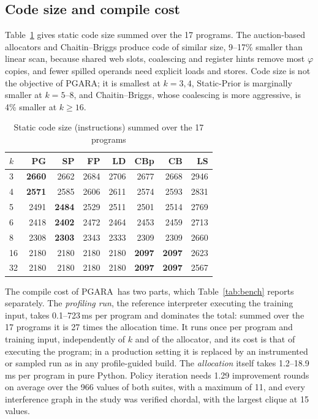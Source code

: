 \documentclass{ieeeaccess}
\newcommand{\MG}{PGARA}
\begin{document}
\subsection{Code size and compile cost}
\label{sec:cost}

Table~\ref{tab:size} gives static code size summed over the 17
programs. The auction-based allocators and Chaitin--Briggs produce code
of similar size, 9--17\% smaller than linear scan, because shared web
slots, coalescing and register hints remove most $\varphi$ copies, and
fewer spilled operands need explicit loads and stores. Code size is not
the objective of \MG; it is smallest at $k=3,4$, Static-Prior is
marginally smaller at $k=5$--8, and Chaitin--Briggs, whose coalescing
is more aggressive, is 4\% smaller at $k\ge16$.

\begin{table}[t]
\centering
\caption{Static code size (instructions) summed over the 17 programs}
\label{tab:size}
\footnotesize
\setlength{\tabcolsep}{3.4pt}
\begin{tabular}{@{}lrrrrrrr@{}}
\toprule
$k$ & PG & SP & FP & LD & CBp & CB & LS \\
\midrule
3 & \textbf{2660} & 2662 & 2684 & 2706 & 2677 & 2668 & 2946 \\
4 & \textbf{2571} & 2585 & 2606 & 2611 & 2574 & 2593 & 2831 \\
5 & 2491 & \textbf{2484} & 2529 & 2511 & 2501 & 2514 & 2769 \\
6 & 2418 & \textbf{2402} & 2472 & 2464 & 2453 & 2459 & 2713 \\
8 & 2308 & \textbf{2303} & 2343 & 2333 & 2309 & 2309 & 2660 \\
16 & 2180 & 2180 & 2180 & 2180 & \textbf{2097} & \textbf{2097} & 2623 \\
32 & 2180 & 2180 & 2180 & 2180 & \textbf{2097} & \textbf{2097} & 2567 \\
\bottomrule
\end{tabular}
\end{table}

The compile cost of \MG\ has two parts, which Table~\ref{tab:bench}
reports separately. The \emph{profiling run}, the reference interpreter
executing the training input, takes 0.1--723\,ms per program and
dominates the total: summed over the 17 programs it is 27 times the
allocation time. It runs once per program and training input,
independently of $k$ and of the allocator, and its cost is that of
executing the program; in a production setting it is replaced by an
instrumented or sampled run as in any profile-guided build. The
\emph{allocation} itself takes 1.2--18.9\,ms per program in pure
Python. Policy iteration needs 1.29 improvement rounds on average over
the 966 values of both suites, with a maximum of 11, and every
interference graph in the study was verified chordal, with the largest
clique at 15 values.
\end{document}
